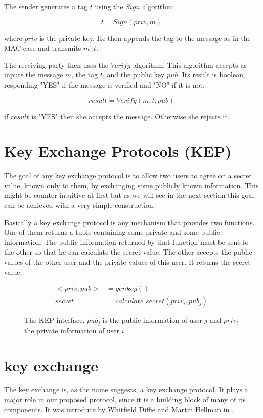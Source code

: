 The sender generates a tag $t$ using the $Sign$ algorithm:

\[
  t = Sign(priv, m)
\]

where $priv$ is the private key.
He then appends the tag to the message as in the MAC case and transmits $m||t$.

The receiving party then uses the $Verify$ algorithm.
This algorithm accepts as inputs the message $m$, the tag $t$, and the public key $pub$.
Its result is boolean, responding "YES" if the message is verified and "NO" if it is not:

\[
  result = Verify(m,t,pub)
\]

if $result$ is "YES" then she accepts the message. Otherwise she rejects it.

\section{Key Exchange Protocols (KEP)}

The goal of any key exchange protocol is to allow two users to agree on a secret value, known only to them, by exchanging some publicly known information.
This might be counter intuitive at first but as we will see in the next section this goal can be achieved with a very simple construction.

Basically a key exchange protocol is any mechanism that provides two functions.
One of them returns a tuple containing some private and some public information.
The public information returned by that function must be sent to the other so that he can calculate the secret value.
The other accepts the public values of the other user and the private values of this user.
It returns the secret value.

\begin{figure}[H]
  \begin{align*}
    <priv, pub> &= genkey() \\
    secret &= calculate\_secret(priv_i, pub_j)
  \end{align*}
  \caption[The interface of a Key Exchange Protocol]{The KEP interface. $pub_j$ is the public information of user $j$ and $priv_i$ the private information of user $i$.}
\end{figure}

\section{\dhname key exchange}

The \dhname key exchange is, as the name suggests, a key exchange protocol.
It plays a major role in our proposed protocol, since it is a building block of many of its components.
It was introduce by Whitfield Diffie and Martin Hellman in \cite{dhpaper}.

